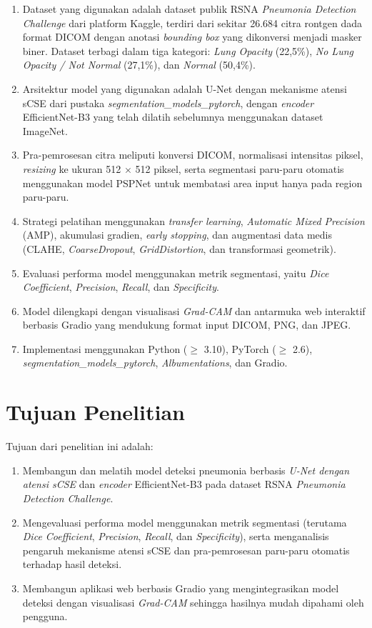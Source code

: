 \documentclass[12pt,a4paper,oneside]{book}
\begin{document}
\begin{enumerate}
  \item Dataset yang digunakan adalah dataset publik RSNA \textit{Pneumonia Detection Challenge} dari platform Kaggle, terdiri dari sekitar 26.684 citra rontgen dada format DICOM dengan anotasi \textit{bounding box} yang dikonversi menjadi masker biner. Dataset terbagi dalam tiga kategori: \textit{Lung Opacity} (22,5\%), \textit{No Lung Opacity / Not Normal} (27,1\%), dan \textit{Normal} (50,4\%).
  \item Arsitektur model yang digunakan adalah U-Net dengan mekanisme atensi sCSE dari pustaka \textit{segmentation\_models\_pytorch}, dengan \textit{encoder} EfficientNet-B3 yang telah dilatih sebelumnya menggunakan dataset ImageNet.
  \item Pra-pemrosesan citra meliputi konversi DICOM, normalisasi intensitas piksel, \textit{resizing} ke ukuran 512 $\times$ 512 piksel, serta segmentasi paru-paru otomatis menggunakan model PSPNet untuk membatasi area input hanya pada region paru-paru.
  \item Strategi pelatihan menggunakan \textit{transfer learning}, \textit{Automatic Mixed Precision} (AMP), akumulasi gradien, \textit{early stopping}, dan augmentasi data medis (CLAHE, \textit{CoarseDropout}, \textit{GridDistortion}, dan transformasi geometrik).
  \item Evaluasi performa model menggunakan metrik segmentasi, yaitu \textit{Dice Coefficient}, \textit{Precision}, \textit{Recall}, dan \textit{Specificity}.
  \item Model dilengkapi dengan visualisasi \textit{Grad-CAM} dan antarmuka web interaktif berbasis Gradio yang mendukung format input DICOM, PNG, dan JPEG.
  \item Implementasi menggunakan Python ($\geq$ 3.10), PyTorch ($\geq$ 2.6), \textit{segmentation\_models\_pytorch}, \textit{Albumentations}, dan Gradio.
\end{enumerate}

\section{Tujuan Penelitian}

Tujuan dari penelitian ini adalah:

\begin{enumerate}
  \item Membangun dan melatih model deteksi pneumonia berbasis \textit{U-Net dengan atensi sCSE} dan \textit{encoder} EfficientNet-B3 pada dataset RSNA \textit{Pneumonia Detection Challenge}.
  \item Mengevaluasi performa model menggunakan metrik segmentasi (terutama \textit{Dice Coefficient}, \textit{Precision}, \textit{Recall}, dan \textit{Specificity}), serta menganalisis pengaruh mekanisme atensi sCSE dan pra-pemrosesan paru-paru otomatis terhadap hasil deteksi.
  \item Membangun aplikasi web berbasis Gradio yang mengintegrasikan model deteksi dengan visualisasi \textit{Grad-CAM} sehingga hasilnya mudah dipahami oleh pengguna.
\end{enumerate}
\end{document}
